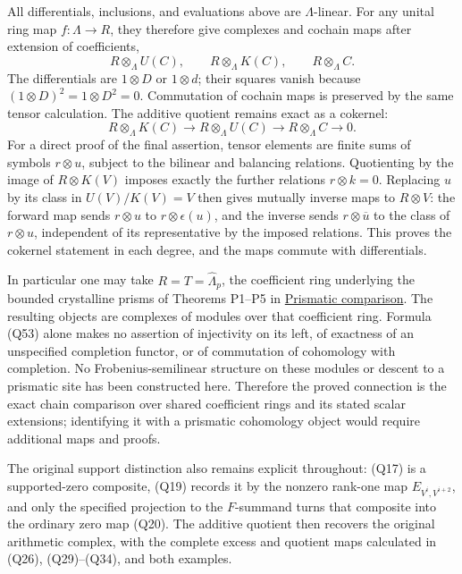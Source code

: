 \documentclass[
]{article}
\begin{document}
All differentials, inclusions, and evaluations above are
\(\Lambda\)-linear. For any unital ring map \(f:\Lambda\to R\), they
therefore give complexes and cochain maps after extension of
coefficients, \[
R\otimes_\Lambda U(C),\qquad
R\otimes_\Lambda K(C),\qquad
R\otimes_\Lambda C.
\tag{Q52}
\] The differentials are \(1\otimes D\) or \(1\otimes d\); their squares
vanish because \((1\otimes D)^2=1\otimes D^2=0\). Commutation of cochain
maps is preserved by the same tensor calculation. The additive quotient
remains exact as a cokernel: \[
R\otimes_\Lambda K(C)\longrightarrow
R\otimes_\Lambda U(C)\longrightarrow
R\otimes_\Lambda C\longrightarrow0.
\tag{Q53}
\] For a direct proof of the final assertion, tensor elements are finite
sums of symbols \(r\otimes u\), subject to the bilinear and balancing
relations. Quotienting by the image of \(R\otimes K(V)\) imposes exactly
the further relations \(r\otimes k=0\). Replacing \(u\) by its class in
\(U(V)/K(V)=V\) then gives mutually inverse maps to \(R\otimes V\): the
forward map sends \(r\otimes u\) to \(r\otimes\epsilon(u)\), and the
inverse sends \(r\otimes\overline u\) to the class of \(r\otimes u\),
independent of its representative by the imposed relations. This proves
the cokernel statement in each degree, and the maps commute with
differentials.

In particular one may take \(R=T=\widehat\Lambda_p\), the coefficient
ring underlying the bounded crystalline prisms of Theorems P1--P5 in
\href{https://github.com/KokunoYumeto/zeta-function-research-reader/blob/6af54ea3c8ef99127af327f3103e086c68d482c2/workbenches/splitzero-tandem/branches/identity-absorber-square/PRISMATIC_COMPARISON.md}{Prismatic
comparison}. The resulting objects are complexes of modules over that
coefficient ring. Formula (Q53) alone makes no assertion of injectivity
on its left, of exactness of an unspecified completion functor, or of
commutation of cohomology with completion. No Frobenius-semilinear
structure on these modules or descent to a prismatic site has been
constructed here. Therefore the proved connection is the exact chain
comparison over shared coefficient rings and its stated scalar
extensions; identifying it with a prismatic cohomology object would
require additional maps and proofs.

The original support distinction also remains explicit throughout: (Q17)
is a supported-zero composite, (Q19) records it by the nonzero rank-one
map \(E_{V^i,V^{i+2}}\), and only the specified projection to the
\(F\)-summand turns that composite into the ordinary zero map (Q20). The
additive quotient then recovers the original arithmetic complex, with
the complete excess and quotient maps calculated in (Q26), (Q29)--(Q34),
and both examples.
\end{document}
